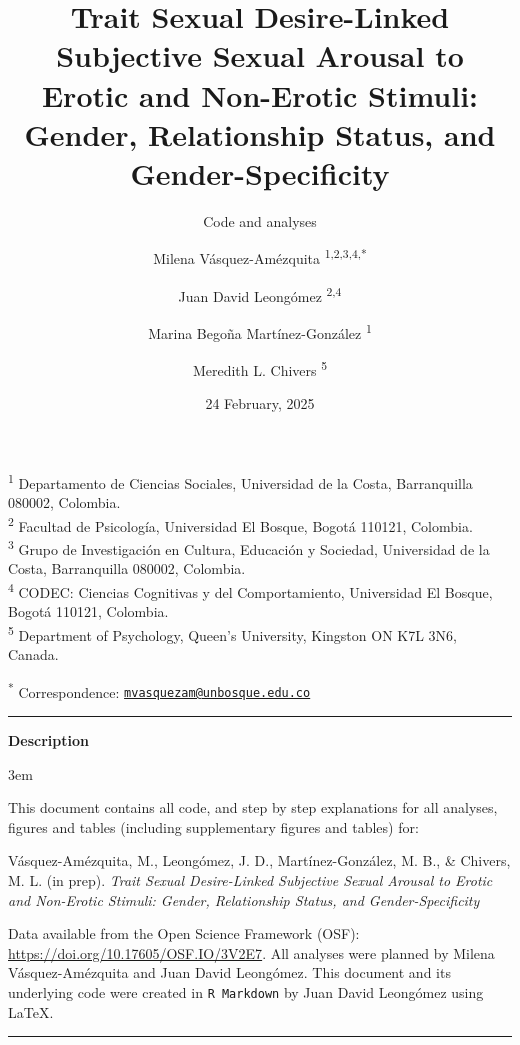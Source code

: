 \documentclass[
  bookmarksnumbered]{article}
\title{Trait Sexual Desire-Linked Subjective Sexual Arousal to Erotic and Non-Erotic Stimuli: Gender, Relationship Status, and Gender-Specificity}
\subtitle{Code and analyses}
\author{Milena Vásquez-Amézquita \orcidlink{0000-0001-7317-8430}\textsuperscript{1,2,3,4,*} \and Juan David Leongómez \orcidlink{0000-0002-0092-6298}\textsuperscript{2,4} \and Marina Begoña Martínez-González \orcidlink{0000-0002-5840-6383}\textsuperscript{1} \and Meredith L. Chivers \orcidlink{0000-0002-5495-9263}\textsuperscript{5}}
\date{24 February, 2025}
\begin{document}
\maketitle

\textsuperscript{1} Departamento de Ciencias Sociales, Universidad de la Costa, Barranquilla 080002, Colombia.\\
\textsuperscript{2} Facultad de Psicología, Universidad El Bosque, Bogotá 110121, Colombia.\\
\textsuperscript{3} Grupo de Investigación en Cultura, Educación y Sociedad, Universidad de la Costa, Barranquilla 080002, Colombia.\\
\textsuperscript{4} CODEC: Ciencias Cognitivas y del Comportamiento, Universidad El Bosque, Bogotá 110121, Colombia.\\
\textsuperscript{5} Department of Psychology, Queen's University, Kingston ON K7L 3N6, Canada.

\textsuperscript{*} Correspondence: \href{mailto:mvasquezam@unbosque.edu.co}{\href{mailto:mvasquezam@unbosque.edu.co}{\nolinkurl{mvasquezam@unbosque.edu.co}}}

\begin{center}\rule{0.5\linewidth}{0.5pt}\end{center}

\begin{center}
\textbf{Description}
\end{center}

\par
\begingroup
\leftskip3em
\rightskip\leftskip

This document contains all code, and step by step explanations for all analyses, figures and tables (including supplementary figures and tables) for:

\begin{hangparas}{.25in}{1}
Vásquez-Amézquita, M., Leongómez, J. D., Martínez-González, M. B., \& Chivers, M. L. (in prep). \textit{Trait Sexual Desire-Linked Subjective Sexual Arousal to Erotic and Non-Erotic Stimuli: Gender, Relationship Status, and Gender-Specificity}
\end{hangparas}

Data available from the Open Science Framework (OSF): \url{https://doi.org/10.17605/OSF.IO/3V2E7}. All analyses were planned by Milena Vásquez-Amézquita and Juan David Leongómez. This document and its underlying code were created in \texttt{R\ Markdown} by Juan David Leongómez using \LaTeX.

\begin{center}\rule{0.5\linewidth}{0.5pt}\end{center}
\end{document}
